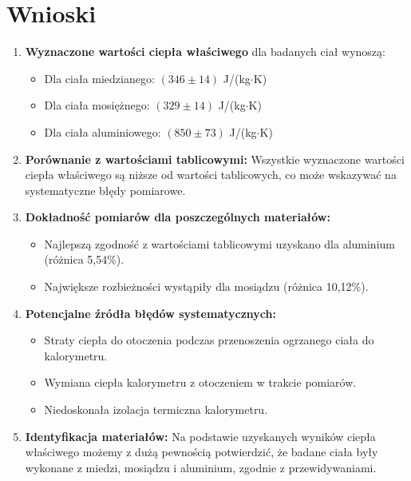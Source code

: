 \documentclass[a4paper,12pt]{article}
\begin{document}
\section{Wnioski}


\begin{enumerate}
    \item \textbf{Wyznaczone wartości ciepła właściwego} dla badanych ciał wynoszą:
          \begin{itemize}
              \item Dla ciała miedzianego: $(346 \pm 14)$ J/(kg$\cdot$K)
              \item Dla ciała mosiężnego: $(329 \pm 14)$ J/(kg$\cdot$K)
              \item Dla ciała aluminiowego: $(850 \pm 73)$ J/(kg$\cdot$K)
          \end{itemize}


    \item \textbf{Porównanie z wartościami tablicowymi:} Wszystkie wyznaczone wartości ciepła właściwego są niższe od wartości tablicowych, co może wskazywać na systematyczne błędy pomiarowe.

    \item \textbf{Dokładność pomiarów dla poszczególnych materiałów:}
          \begin{itemize}
              \item Najlepszą zgodność z wartościami tablicowymi uzyskano dla aluminium (różnica 5,54\%).
              \item Największe rozbieżności wystąpiły dla mosiądzu (różnica 10,12\%).
          \end{itemize}

    \item \textbf{Potencjalne źródła błędów systematycznych:}
          \begin{itemize}
              \item Straty ciepła do otoczenia podczas przenoszenia ogrzanego ciała do kalorymetru.
              \item Wymiana ciepła kalorymetru z otoczeniem w trakcie pomiarów.
              \item Niedoskonała izolacja termiczna kalorymetru.
          \end{itemize}

    \item \textbf{Identyfikacja materiałów:} Na podstawie uzyskanych wyników ciepła właściwego możemy z dużą pewnością potwierdzić, że badane ciała były wykonane z miedzi, mosiądzu i aluminium, zgodnie z przewidywaniami.

\end{enumerate}
\end{document}
